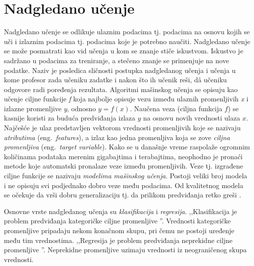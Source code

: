 \documentclass[12pt,oneside]{memoir}
\begin{document}
\section{Nadgledano učenje}
Nadgledano učenje se odlikuje ulaznim podacima tj. podacima na osnovu kojih se uči i izlaznim podacima tj. podacima koje je potrebno naučiti. 
Nadgledano učenje se može posmatrati kao vid učenja u kom se znanje stiče iskustvom. Iskustvo je sadržano u podacima za treniranje, a stečeno znanje se primenjuje na nove podatke. 
%
Naziv je posledica sličnosti postupka nadgledanog učenja i učenja u kome profesor zada učeniku zadatke i nakon što ih učenik reši, d\^a učeniku odgovore radi poređenja rezultata. Algoritmi mašinskog učenja se opisuju kao učenje ciljne funkcije \textit{f} koja najbolje opisuje vezu između ulaznih promenljivih \textit{x} i izlazne promenljive \textit{y}, odnosno $y=f(x)$. Naučena veza (ciljna funkcija $f$) se kasnije koristi za buduća predviđanja izlaza $y$ na osnovu novih vrednosti ulaza $x$. Najčešće je ulaz predstavljen vektorom vrednosti promenljivih koje se nazivaju \textit{atributima} (eng.~\textit{features}), a izlaz kao jedna promenljiva koja se zove \textit{ciljna promenljiva} (eng.~\textit{target variable}). 
Kako se u današnje vreme raspolaže ogromnim količinama podataka merenim gigabajtima i terabajtima, neophodno je pronaći metode koje automatski pronalaze veze između promenljivih. Veze tj. izgrađene ciljne funkcije se nazivaju \textit{modelima mašinskog učenja}. Postoji veliki broj modela i ne opisuju svi podjednako dobro veze među podacima. Od kvalitetnog modela se očekuje da vrši dobru generalizaciju tj. da prilikom predviđanja retko greši \cite{mladen, mlm, UMLFTA}. %

Osnovne vrste nadgledanog učenja su \textit{klasifikacija} i \textit{regresija}.
,,Klasifikacija je problem predviđanja kategoričke ciljne promenljive \cite{mladen}''. Vrednosti kategoričke promenljive pripadaju nekom konačnom skupu, pri čemu ne postoji uređenje među tim vrednostima. 
,,Regresija je problem predviđanja neprekidne ciljne promenljive \cite{mladen}''.  Neprekidne promenljive uzimaju vrednosti iz neograničenog skupa vrednosti.
\end{document}
